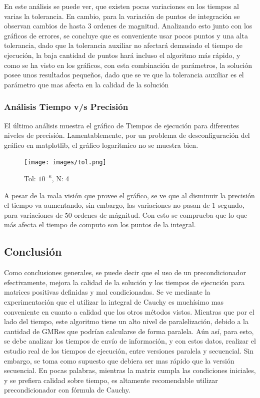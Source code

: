 \documentclass[fleqn]{article}
\begin{document}
En este análisis se puede ver, que existen pocas variaciones en los tiempos al varias la tolerancia. En cambio, para la variación de puntos de integración se observan cambios de hasta 3 ordenes de magnitud. Analizando esto junto con los gráficos de errores, se concluye que es conveniente usar pocos puntos y una alta tolerancia, dado que la tolerancia auxiliar no afectará demasiado el tiempo de ejecución, la baja cantidad de puntos hará incluso el algoritmo más rápido, y como se ha visto en los gráficos, con esta combinación de parámetros, la solución posee unos resultados pequeños, dado que se ve que la tolerancia auxiliar es el parámetro que mas afecta en la calidad de la solución

\subsubsection*{Análisis Tiempo v/s Precisión}
El último análisis muestra el gráfico de Tiempos de ejecución para diferentes niveles de precisión. Lamentablemente, por un problema de desconfiguración del gráfico en matplotlib, el gráfico logarítmico no se muestra bien. 


\begin{figure}[ht]
    \centering
    \texttt{[image: images/tol.png]}
    \caption{Tol: $10^{-6}$, N: 4}
    \label{fig:23}
\end{figure}

A pesar de la mala visión que provee el gráfico, se ve que al disminuir la precisión el tiempo va aumentando, sin embargo, las variaciones no pasan de 1 segundo, para variaciones de 50 ordenes de mágnitud. Con esto se comprueba que lo que más afecta el tiempo de computo son los puntos de la integral.\newpage


\subsection{Conclusión}
Como conclusiones generales, se puede decir que el uso de un precondicionador efectivamente, mejora la calidad de la solución y los tiempos de ejecución para matrices positivas definidas y mal condicionadas. Se ve mediante la experimentación que el utilizar la integral de Cauchy es muchísimo mas conveniente en cuanto a calidad que los otros métodos vistos. Mientras que por el lado del tiempo, este algoritmo tiene un alto nivel de paralelización, debido a la cantidad de GMRes que podrían calcularse de forma paralela. Aún así, para esto, se debe analizar los tiempos de envío de información, y con estos datos, realizar el estudio real de los tiempos de ejecución, entre versiones paralela y secuencial. Sin embargo, se toma como supuesto que debiera ser mas rápido que la versión secuencial. En pocas palabras, mientras la matriz cumpla las condiciones iniciales, y se prefiera calidad sobre tiempo, es altamente recomendable utilizar precondicionador con fórmula de Cauchy.




\end{document}

